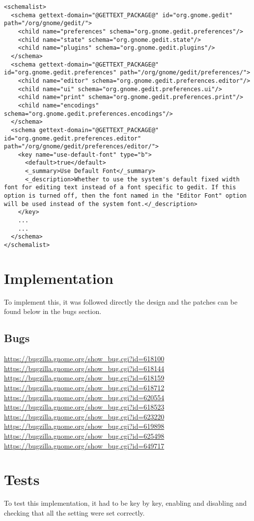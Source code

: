 \begin{lstlisting}[style=xml]
<schemalist>
  <schema gettext-domain="@GETTEXT_PACKAGE@" id="org.gnome.gedit" path="/org/gnome/gedit/">
    <child name="preferences" schema="org.gnome.gedit.preferences"/>
    <child name="state" schema="org.gnome.gedit.state"/>
    <child name="plugins" schema="org.gnome.gedit.plugins"/>
  </schema>
  <schema gettext-domain="@GETTEXT_PACKAGE@" id="org.gnome.gedit.preferences" path="/org/gnome/gedit/preferences/">
    <child name="editor" schema="org.gnome.gedit.preferences.editor"/>
    <child name="ui" schema="org.gnome.gedit.preferences.ui"/>
    <child name="print" schema="org.gnome.gedit.preferences.print"/>
    <child name="encodings" schema="org.gnome.gedit.preferences.encodings"/>
  </schema>
  <schema gettext-domain="@GETTEXT_PACKAGE@" id="org.gnome.gedit.preferences.editor" path="/org/gnome/gedit/preferences/editor/">
    <key name="use-default-font" type="b">
      <default>true</default>
      <_summary>Use Default Font</_summary>
      <_description>Whether to use the system's default fixed width font for editing text instead of a font specific to gedit. If this option is turned off, then the font named in the "Editor Font" option will be used instead of the system font.</_description>
    </key>
    ...
    ...
  </schema>
</schemalist>
\end{lstlisting}

\section{Implementation}

To implement this, it was followed directly the design and the patches can be found below in the bugs section.

\subsection{Bugs}

\noindent\url{https://bugzilla.gnome.org/show_bug.cgi?id=618100}\\
\noindent\url{https://bugzilla.gnome.org/show_bug.cgi?id=618144}\\
\noindent\url{https://bugzilla.gnome.org/show_bug.cgi?id=618159}\\
\noindent\url{https://bugzilla.gnome.org/show_bug.cgi?id=618712}\\
\noindent\url{https://bugzilla.gnome.org/show_bug.cgi?id=620554}\\
\noindent\url{https://bugzilla.gnome.org/show_bug.cgi?id=618523}\\
\noindent\url{https://bugzilla.gnome.org/show_bug.cgi?id=623220}\\
\noindent\url{https://bugzilla.gnome.org/show_bug.cgi?id=619898}\\
\noindent\url{https://bugzilla.gnome.org/show_bug.cgi?id=625498}\\
\noindent\url{https://bugzilla.gnome.org/show_bug.cgi?id=649717}

\section{Tests}

To test this implementation, it had to be key by key, enabling and disabling and checking that all the setting were set correctly.
